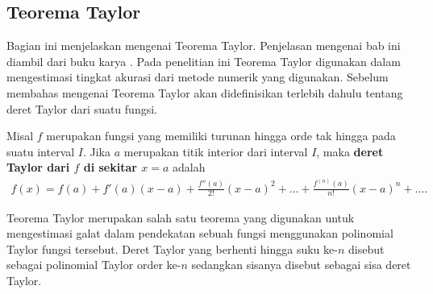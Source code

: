 \subsection{Teorema Taylor}

Bagian ini menjelaskan mengenai Teorema Taylor. Penjelasan mengenai bab ini diambil dari buku karya \citep{bartle}. Pada penelitian ini Teorema Taylor digunakan dalam mengestimasi tingkat akurasi dari metode numerik yang digunakan. Sebelum membahas mengenai Teorema Taylor akan didefinisikan terlebih dahulu tentang deret Taylor dari suatu fungsi.
\begin{definisi}
    Misal $f$ merupakan fungsi yang memiliki turunan hingga orde tak hingga pada suatu interval $I$. Jika $a$ merupakan titik interior dari interval $I$, maka \textbf{deret Taylor dari $f$ di sekitar $x=a$} adalah
    \begin{align}
        f(x)=f(a)+f'(a)(x-a)+\frac{f''(a)}{2!}(x-a)^2+\dots+\frac{f^{(n)}(a)}{n!}(x-a)^n+\dots.
    \end{align}
\end{definisi}

Teorema Taylor merupakan salah satu teorema yang digunakan untuk mengestimasi galat dalam pendekatan sebuah fungsi menggunakan polinomial Taylor fungsi tersebut. Deret Taylor yang berhenti hingga suku ke-$n$ disebut sebagai polinomial Taylor order ke-$n$ sedangkan sisanya disebut sebagai sisa deret Taylor.


